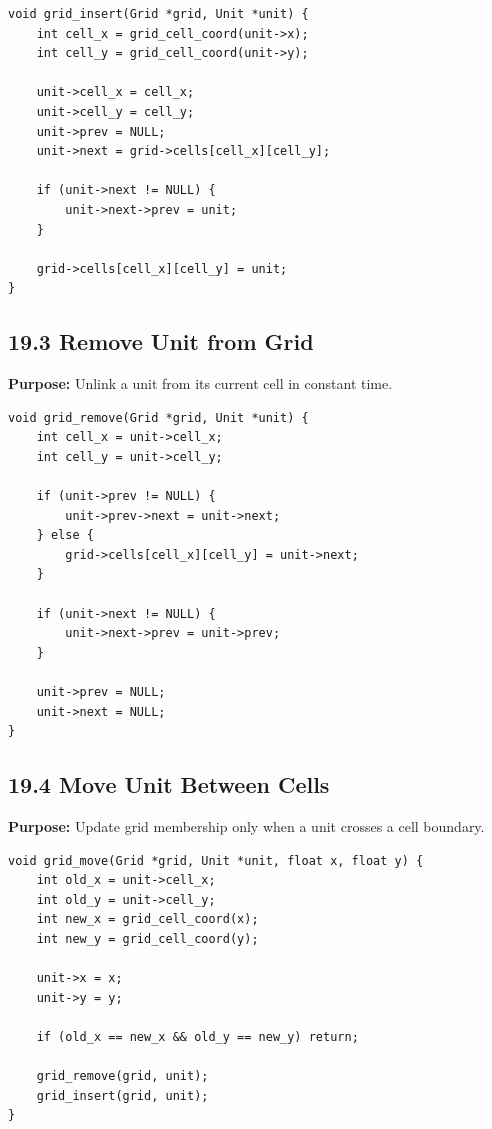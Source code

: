\documentclass[10pt,letterpaper]{article}
\begin{document}
\begin{verbatim}
void grid_insert(Grid *grid, Unit *unit) {
    int cell_x = grid_cell_coord(unit->x);
    int cell_y = grid_cell_coord(unit->y);

    unit->cell_x = cell_x;
    unit->cell_y = cell_y;
    unit->prev = NULL;
    unit->next = grid->cells[cell_x][cell_y];

    if (unit->next != NULL) {
        unit->next->prev = unit;
    }

    grid->cells[cell_x][cell_y] = unit;
}
\end{verbatim}

\subsection{19.3 Remove Unit from Grid}

\textbf{Purpose:} Unlink a unit from its current cell in constant time.

\begin{verbatim}
void grid_remove(Grid *grid, Unit *unit) {
    int cell_x = unit->cell_x;
    int cell_y = unit->cell_y;

    if (unit->prev != NULL) {
        unit->prev->next = unit->next;
    } else {
        grid->cells[cell_x][cell_y] = unit->next;
    }

    if (unit->next != NULL) {
        unit->next->prev = unit->prev;
    }

    unit->prev = NULL;
    unit->next = NULL;
}
\end{verbatim}

\subsection{19.4 Move Unit Between Cells}

\textbf{Purpose:} Update grid membership only when a unit crosses a cell boundary.

\begin{verbatim}
void grid_move(Grid *grid, Unit *unit, float x, float y) {
    int old_x = unit->cell_x;
    int old_y = unit->cell_y;
    int new_x = grid_cell_coord(x);
    int new_y = grid_cell_coord(y);

    unit->x = x;
    unit->y = y;

    if (old_x == new_x && old_y == new_y) return;

    grid_remove(grid, unit);
    grid_insert(grid, unit);
}
\end{verbatim}
\end{document}
